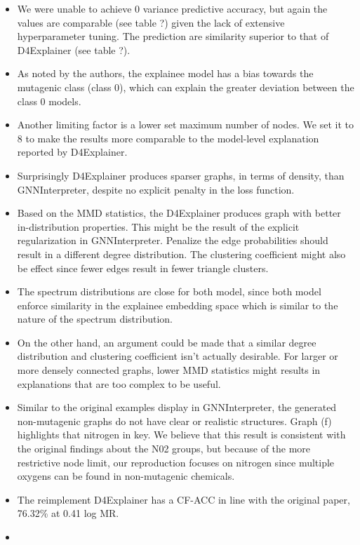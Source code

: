 \documentclass[
  11pt,
  letterpaper,
]{article}
\begin{document}
\begin{itemize}
\item
  We were unable to achieve 0 variance predictive accuracy, but again
  the values are comparable (see table ?) given the lack of extensive
  hyperparameter tuning. The prediction are similarity superior to that
  of D4Explainer (see table ?).
\item
  As noted by the authors, the explainee model has a bias towards the
  mutagenic class (class 0), which can explain the greater deviation
  between the class 0 models.
\item
  Another limiting factor is a lower set maximum number of nodes. We set
  it to 8 to make the results more comparable to the model-level
  explanation reported by D4Explainer.
\item
  Surprisingly D4Explainer produces sparser graphs, in terms of density,
  than GNNInterpreter, despite no explicit penalty in the loss function.
\item
  Based on the MMD statistics, the D4Explainer produces graph with
  better in-distribution properties. This might be the result of the
  explicit regularization in GNNInterpreter. Penalize the edge
  probabilities should result in a different degree distribution. The
  clustering coefficient might also be effect since fewer edges result
  in fewer triangle clusters.
\item
  The spectrum distributions are close for both model, since both model
  enforce similarity in the explainee embedding space which is similar
  to the nature of the spectrum distribution.
\item
  On the other hand, an argument could be made that a similar degree
  distribution and clustering coefficient isn't actually desirable. For
  larger or more densely connected graphs, lower MMD statistics might
  results in explanations that are too complex to be useful.
\item
  Similar to the original examples display in GNNInterpreter, the
  generated non-mutagenic graphs do not have clear or realistic
  structures. Graph (f) highlights that nitrogen in key. We believe that
  this result is consistent with the original findings about the N02
  groups, but because of the more restrictive node limit, our
  reproduction focuses on nitrogen since multiple oxygens can be found
  in non-mutagenic chemicals.
\item
  The reimplement D4Explainer has a CF-ACC in line with the original
  paper, 76.32\% at 0.41 log MR.
\item

\end{itemize}
\end{document}
